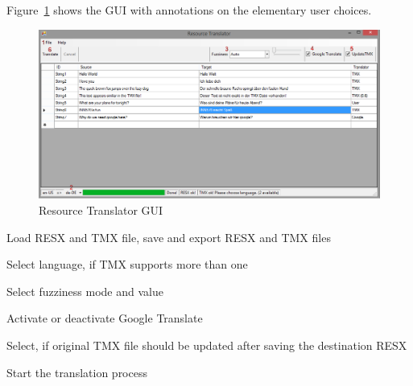 \documentclass[a4paper, 12pt]{scrartcl} %
\begin{document}
Figure~\ref{fig:app} shows the GUI with annotations on the elementary user choices.
\begin{figure}
  \centering
  \includegraphics[width=\textwidth]{ResourceTranslator-annotated.png}
  \caption{Resource Translator GUI}
  \label{fig:app}
\end{figure}

\begin{enumarabic}
\item Load RESX and TMX file, save and export RESX and TMX files
\item Select language, if TMX supports more than one
\item Select fuzziness mode and value
\item Activate or deactivate Google Translate
\item Select, if original TMX file should be updated after saving the destination RESX
\item Start the translation process
\end{enumarabic}
%
%
\end{document}
